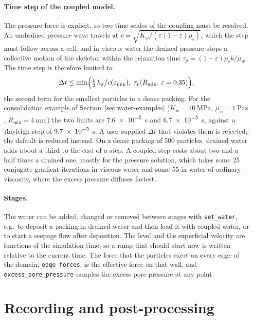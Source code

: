 \paragraph{Time step of the coupled model.}  The pressure force is explicit, so
two time scales of the coupling must be resolved.  An undrained pressure wave
travels at $c=\sqrt{K_{w}/(\varepsilon(1-\varepsilon)\rho_{s})}$, which the step must
follow across a cell; and in viscous water the drained pressure stops a
collective motion of the skeleton within the relaxation time
$\tau_{p}=(1-\varepsilon)\rho_{s}k/\mu_{w}$.  The time step is therefore limited to
\begin{equation}
  \Delta t \le \min\Bigl(\tfrac{1}{2}\,h_{\varepsilon}\big/c(\varepsilon_{\min}),\;
                        \tau_{p}(R_{\min},\,\varepsilon=0.35)\Bigr),
  \label{eq:coupled-dt}
\end{equation}
the second term for the smallest particles in a dense packing.  For the
consolidation example of Section~\ref{sec:water-examples}
($K_{w}=\qty{10}{\mega\pascal}$, $\mu_{w}=\qty{1}{\pascal\second}$, $R_{\min}=\qty{4}{\milli\metre}$) the two limits are
\qty{7.6e-5}{\second} and \qty{6.7e-5}{\second}, against a Rayleigh step of
\qty{9.7e-5}{\second}.  A user-supplied $\Delta t$ that violates them is
rejected; the default is reduced instead.  On a dense packing of \num{500}
particles, drained water adds about a third to the cost of a step.  A coupled
step costs about two and a half times a drained one, mostly for the pressure
solution, which takes some \num{25} conjugate-gradient iterations in viscous
water and some \num{55} in water of ordinary viscosity, where the excess pressure
diffuses fastest.

\paragraph{Stages.}  The water can be added, changed or removed between stages
with \texttt{set\_water}, e.g.\ to deposit a packing in drained water and then
load it with coupled water, or to start a seepage flow after deposition.  The
level and the superficial velocity are functions of the simulation time, so a
ramp that should start now is written relative to the current time.  The force
that the particles exert on every edge of the domain, \texttt{edge\_forces}, is
the effective force on that wall, and \texttt{excess\_pore\_pressure} samples the
excess pore pressure at any point.

\section{Recording and post-processing}
\label{sec:recording}

